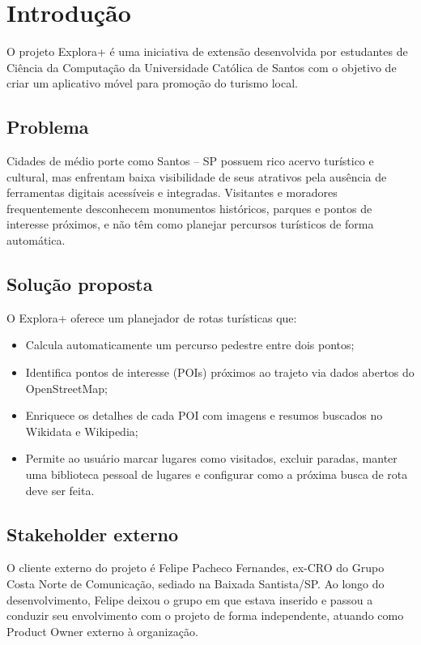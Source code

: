 \documentclass[12pt, a4paper]{article}
\begin{document}
\section{Introdu\c{c}\~ao}

O projeto Explora+ \'e uma iniciativa de extens\~ao desenvolvida por estudantes de Ci\^encia da Computa\c{c}\~ao da Universidade Cat\'olica de Santos com o objetivo de criar um aplicativo m\'ovel para promo\c{c}\~ao do turismo local.

\subsection{Problema}

Cidades de m\'edio porte como Santos -- SP possuem rico acervo tur\'istico e cultural, mas enfrentam baixa visibilidade de seus atrativos pela aus\^encia de ferramentas digitais acess\'iveis e integradas. Visitantes e moradores frequentemente desconhecem monumentos hist\'oricos, parques e pontos de interesse pr\'oximos, e n\~ao t\^em como planejar percursos tur\'isticos de forma autom\'atica.

\subsection{Solu\c{c}\~ao proposta}

O Explora+ oferece um planejador de rotas tur\'isticas que:

\begin{itemize}
  \item Calcula automaticamente um percurso pedestre entre dois pontos;
  \item Identifica pontos de interesse (POIs) pr\'oximos ao trajeto via dados abertos do OpenStreetMap;
  \item Enriquece os detalhes de cada POI com imagens e resumos buscados no Wikidata e Wikipedia;
  \item Permite ao usu\'ario marcar lugares como visitados, excluir paradas, manter uma biblioteca pessoal de lugares e configurar como a pr\'oxima busca de rota deve ser feita.
\end{itemize}

\subsection{Stakeholder externo}

O cliente externo do projeto \'e Felipe Pacheco Fernandes, ex-CRO do Grupo Costa Norte de Comunica\c{c}\~ao, sediado na Baixada Santista/SP. Ao longo do desenvolvimento, Felipe deixou o grupo em que estava inserido e passou a conduzir seu envolvimento com o projeto de forma independente, atuando como Product Owner externo \`a organiza\c{c}\~ao.
\end{document}
